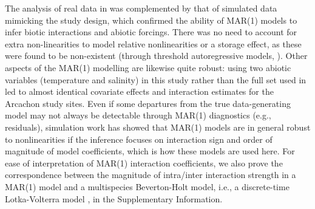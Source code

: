 \documentclass[10pt]{article}
\begin{document}
The analysis of real data in \citet{barraquand_coastal_2018} was complemented by
that of simulated data mimicking the study design, which confirmed
the ability of MAR(1) models to infer biotic interactions and abiotic
forcings. There was no need to account for extra non-linearities to
model relative nonlinearities or a storage effect, as these were found
to be non-existent (through threshold autoregressive models, \citealp{barraquand_coastal_2018}).
Other aspects of the MAR(1) modelling are likewise quite robust: using
two abiotic variables (temperature and salinity) in this study rather
than the full set used in \citet{barraquand_coastal_2018} led to
almost identical covariate effects and interaction estimates for the
Arcachon study sites. Even if some departures from the true data-generating
model may not always be detectable through MAR(1) diagnostics (e.g.,
residuals), simulation work has showed that MAR(1) models are in general
robust to nonlinearities \citep{certain_how_2018} if the inference
focuses on interaction sign and order of magnitude of model coefficients,
which is how these models are used here. For
ease of interpretation of MAR(1) interaction coefficients, we also
prove the correspondence between the magnitude of intra/inter interaction
strength in a MAR(1) model and a multispecies Beverton-Holt model,
i.e., a discrete-time Lotka-Volterra model \citep{cushing_discrete_2004},
in the Supplementary Information.
\end{document}

